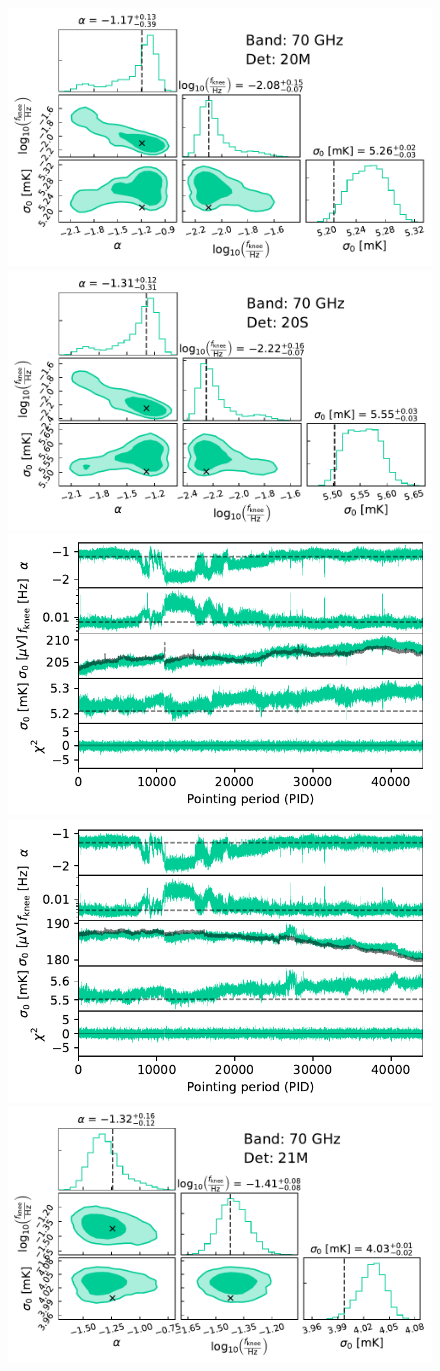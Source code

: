 \documentclass[twocolumn]{aa}
\begin{document}
\begin{figure}[p]
	\begin{center}
		\includegraphics[width=0.495\linewidth]{figs/corner_band_070_det_5_mean.pdf}
		\includegraphics[width=0.495\linewidth]{figs/corner_band_070_det_6_mean.pdf}\\
		\includegraphics[width=0.495\linewidth]{figs/xi_vs_pid_band_070_det_5_mean.pdf}
		\includegraphics[width=0.495\linewidth]{figs/xi_vs_pid_band_070_det_6_mean.pdf}\\
		\vspace*{0.5mm}
		\includegraphics[width=0.495\linewidth]{figs/corner_band_070_det_7_mean.pdf}

\end{center}
\end{figure}
\end{document}
